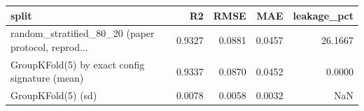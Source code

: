 \begin{tabular}{lrrrr}
\toprule
                                             split &     R2 &   RMSE &    MAE &  leakage\_pct \\
\midrule
random\_stratified\_80\_20 (paper protocol, reprod... & 0.9327 & 0.0881 & 0.0457 &      26.1667 \\
    GroupKFold(5) by exact config signature (mean) & 0.9337 & 0.0870 & 0.0452 &       0.0000 \\
                                GroupKFold(5) (sd) & 0.0078 & 0.0058 & 0.0032 &          NaN \\
\bottomrule
\end{tabular}
